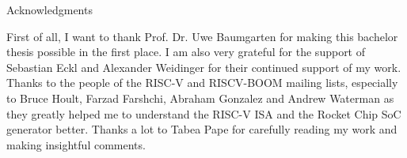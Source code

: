 \thispagestyle{empty}

\vspace*{20mm}

\begin{center}
{ Acknowledgments}
\end{center}

\vspace{10mm}

First of all, I want to thank Prof. Dr. Uwe Baumgarten for making
this bachelor thesis possible in the first place.
I am also very grateful for the support of Sebastian Eckl and Alexander Weidinger for their continued support of my work.
Thanks to the people of the RISC-V and RISCV-BOOM mailing lists,
especially to Bruce Hoult, Farzad Farshchi, Abraham Gonzalez and Andrew Waterman as they
greatly helped me to understand the RISC-V ISA and the Rocket Chip SoC generator better.
Thanks a lot to Tabea Pape for carefully reading my work and making insightful comments.

\cleardoublepage{}
